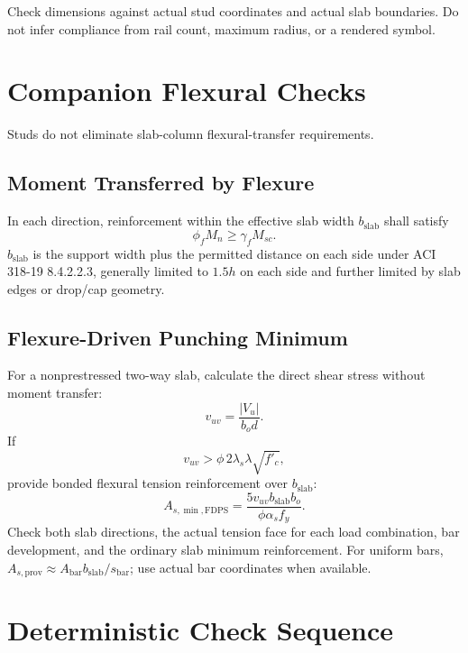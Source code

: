 \documentclass[10pt]{article}
\begin{document}
Check dimensions against actual stud coordinates and actual slab boundaries.
Do not infer compliance from rail count, maximum radius, or a rendered symbol.

\section{Companion Flexural Checks}

Studs do not eliminate slab-column flexural-transfer requirements.

\subsection{Moment Transferred by Flexure}

In each direction, reinforcement within the effective slab width $b_{\mathrm{slab}}$
shall satisfy
\begin{equation}
\phi_f M_n\geq\gamma_f M_{sc}.
\end{equation}
$b_{\mathrm{slab}}$ is the support width plus the permitted distance on each
side under ACI 318-19 8.4.2.2.3, generally limited to $1.5h$ on each side and
further limited by slab edges or drop/cap geometry.

\subsection{Flexure-Driven Punching Minimum}

For a nonprestressed two-way slab, calculate the direct shear stress without
moment transfer:
\begin{equation}
v_{uv}=\frac{|V_u|}{b_od}.
\end{equation}
If
\begin{equation}
v_{uv}>\phi\,2\lambda_s\lambda\sqrt{f'_c},
\end{equation}
provide bonded flexural tension reinforcement over $b_{\mathrm{slab}}$:
\begin{equation}
A_{s,\min,\mathrm{FDPS}}=
\frac{5v_{uv}b_{\mathrm{slab}}b_o}{\phi\alpha_s f_y}.
\end{equation}
Check both slab directions, the actual tension face for each load combination,
bar development, and the ordinary slab minimum reinforcement. For uniform bars,
$A_{s,\mathrm{prov}}\approx A_{\mathrm{bar}}b_{\mathrm{slab}}/s_{\mathrm{bar}}$;
use actual bar coordinates when available.

\section{Deterministic Check Sequence}
\end{document}
